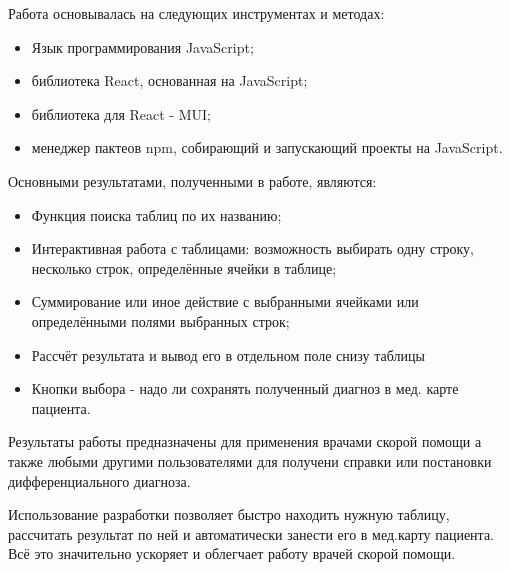 Работа основывалась на следующих инструментах и методах:
\begin{itemize}
\item Язык программирования JavaScript;
\item библиотека React, основанная на  JavaScript;
\item библиотека для React - MUI;
\item менеджер пактеов npm, собирающий и запускающий проекты на JavaScript.
\end{itemize}

Основными результатами, полученными в работе, являются:
\begin{itemize}
\item Функция поиска таблиц по их названию;
\item Интерактивная работа с таблицами: возможность выбирать одну строку, несколько строк, определённые ячейки в таблице;
\item Суммирование или иное действие с выбранными ячейками или определёнными полями выбранных строк;
\item Рассчёт результата и вывод его в отдельном поле снизу таблицы
\item Кнопки выбора - надо ли сохранять полученный диагноз в мед. карте пациента.
\end{itemize}

Результаты работы предназначены для применения врачами скорой помощи а также любыми другими пользователями для получени справки или постановки дифференциального диагноза. 

Использование разработки позволяет быстро находить нужную таблицу, рассчитать результат по ней и автоматически занести его в мед.карту пациента. Всё это значительно ускоряет и облегчает работу врачей скорой помощи.
